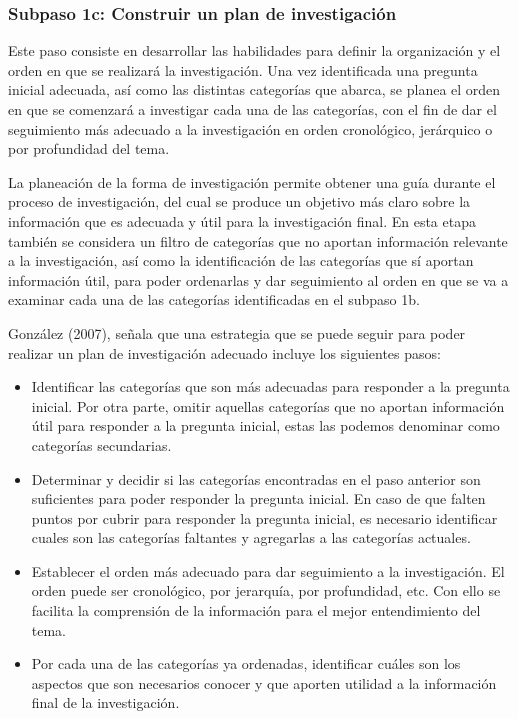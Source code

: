 
\subsubsection{Subpaso 1c: Construir un plan de investigación}
\label{secPaso1cCap2}

Este paso consiste en desarrollar las habilidades para definir la organización y el orden en que se realizará la investigación. Una vez identificada una pregunta inicial adecuada, así como las distintas categorías que abarca, se planea el orden en que se comenzará a investigar cada una de las categorías, con el fin de dar el seguimiento más adecuado a la investigación en orden cronológico, jerárquico o por profundidad del tema.

La planeación de la forma de investigación permite obtener una guía durante el proceso de investigación, del cual se produce un objetivo más claro sobre la información que es adecuada y útil para la investigación final. En esta etapa también se considera un filtro de categorías que no aportan información relevante a la investigación, así como la identificación de las categorías que sí aportan información útil, para poder ordenarlas y dar seguimiento al orden en que se va a examinar cada una de las categorías identificadas en el subpaso 1b.

González (2007), señala que una estrategia que se puede seguir para poder realizar un plan de investigación adecuado incluye los siguientes pasos:

\begin{itemize}
  \item Identificar las categorías que son más adecuadas para responder a la pregunta inicial. Por otra parte, omitir aquellas categorías que no aportan información útil para responder a la pregunta inicial, estas las podemos denominar como categorías secundarias.
  \item Determinar y decidir si las categorías encontradas en el paso anterior son suficientes para poder responder la pregunta inicial. En caso de que falten puntos por cubrir para responder la pregunta inicial, es necesario identificar cuales son las categorías faltantes y agregarlas a las categorías actuales.
  \item Establecer el orden más adecuado para dar seguimiento a la investigación. El orden puede ser cronológico, por jerarquía, por profundidad, etc. Con ello se facilita la comprensión de la información para el mejor entendimiento del tema.
  \item Por cada una de las categorías ya ordenadas, identificar cuáles son los aspectos que son necesarios conocer y que aporten utilidad a la información final de la investigación.
\end{itemize}

